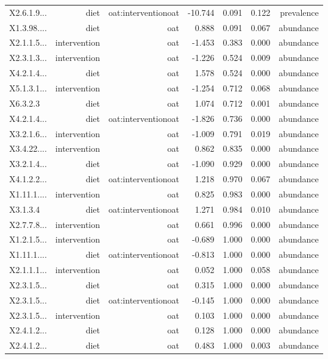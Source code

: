 \documentclass[
]{article}
\begin{document}
\begin{longtable}[t]{lrrrrrr}
X2.6.1.9... & diet & oat:interventionoat & -10.744 & 0.091 & 0.122 & prevalence\\
X1.3.98.... & diet & oat & 0.888 & 0.091 & 0.067 & abundance\\
\addlinespace
X2.1.1.5... & intervention & oat & -1.453 & 0.383 & 0.000 & abundance\\
X2.3.1.3... & intervention & oat & -1.226 & 0.524 & 0.009 & abundance\\
X4.2.1.4... & diet & oat & 1.578 & 0.524 & 0.000 & abundance\\
X5.1.3.1... & intervention & oat & -1.254 & 0.712 & 0.068 & abundance\\
X6.3.2.3 & diet & oat & 1.074 & 0.712 & 0.001 & abundance\\
\addlinespace
X4.2.1.4... & diet & oat:interventionoat & -1.826 & 0.736 & 0.000 & abundance\\
X3.2.1.6... & intervention & oat & -1.009 & 0.791 & 0.019 & abundance\\
X3.4.22.... & intervention & oat & 0.862 & 0.835 & 0.000 & abundance\\
X3.2.1.4... & diet & oat & -1.090 & 0.929 & 0.000 & abundance\\
X4.1.2.2... & diet & oat:interventionoat & 1.218 & 0.970 & 0.067 & abundance\\
\addlinespace
X1.11.1.... & intervention & oat & 0.825 & 0.983 & 0.000 & abundance\\
X3.1.3.4 & diet & oat:interventionoat & 1.271 & 0.984 & 0.010 & abundance\\
X2.7.7.8... & intervention & oat & 0.661 & 0.996 & 0.000 & abundance\\
X1.2.1.5... & intervention & oat & -0.689 & 1.000 & 0.000 & abundance\\
X1.11.1.... & diet & oat:interventionoat & -0.813 & 1.000 & 0.000 & abundance\\
\addlinespace
X2.1.1.1... & intervention & oat & 0.052 & 1.000 & 0.058 & abundance\\
X2.3.1.5... & diet & oat & 0.315 & 1.000 & 0.000 & abundance\\
X2.3.1.5... & diet & oat:interventionoat & -0.145 & 1.000 & 0.000 & abundance\\
X2.3.1.5... & intervention & oat & 0.103 & 1.000 & 0.000 & abundance\\
X2.4.1.2... & diet & oat & 0.128 & 1.000 & 0.000 & abundance\\
\addlinespace
X2.4.1.2... & diet & oat & 0.483 & 1.000 & 0.003 & abundance\\

\end{longtable}
\end{document}
